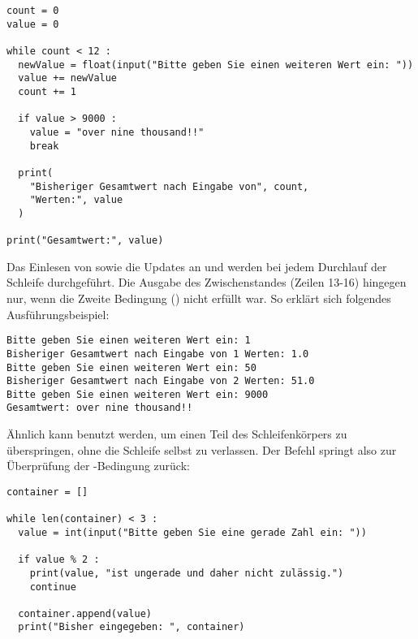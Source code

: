 \begin{codebox}
\begin{verbatim}
count = 0
value = 0

while count < 12 :
  newValue = float(input("Bitte geben Sie einen weiteren Wert ein: "))
  value += newValue
  count += 1
  
  if value > 9000 :
    value = "over nine thousand!!"
    break
  
  print(
    "Bisheriger Gesamtwert nach Eingabe von", count, 
    "Werten:", value
  )

print("Gesamtwert:", value)
\end{verbatim}
\end{codebox}

Das Einlesen von  sowie die Updates an  und  werden bei jedem Durchlauf der Schleife durchgeführt. Die Ausgabe des Zwischenstandes (Zeilen 13-16) hingegen nur, wenn die Zweite Bedingung () nicht erfüllt war. So erklärt sich folgendes Ausführungsbeispiel:

\begin{cmdbox}
\begin{verbatim}
Bitte geben Sie einen weiteren Wert ein: 1
Bisheriger Gesamtwert nach Eingabe von 1 Werten: 1.0
Bitte geben Sie einen weiteren Wert ein: 50
Bisheriger Gesamtwert nach Eingabe von 2 Werten: 51.0
Bitte geben Sie einen weiteren Wert ein: 9000
Gesamtwert: over nine thousand!!
\end{verbatim}
\end{cmdbox}

Ähnlich kann  benutzt werden, um einen Teil des Schleifenkörpers zu überspringen, ohne die Schleife selbst zu verlassen. Der Befehl  springt also zur Überprüfung der -Bedingung zurück:

\begin{codebox}
\begin{verbatim}
container = []

while len(container) < 3 :
  value = int(input("Bitte geben Sie eine gerade Zahl ein: "))
  
  if value % 2 :
    print(value, "ist ungerade und daher nicht zulässig.")
    continue
  
  container.append(value)
  print("Bisher eingegeben: ", container)
\end{verbatim}
\end{codebox}

